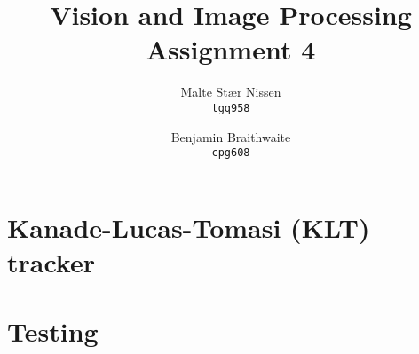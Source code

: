\documentclass[11pt,a4paper]{article}
\title{Vision and Image Processing\\Assignment 4}
\author{Malte Stær Nissen    \\ \texttt{tgq958} \and
        Benjamin Braithwaite \\ \texttt{cpg608}}
\begin{document}
\maketitle

\section{Kanade-Lucas-Tomasi (KLT) tracker}

\section{Testing}
\end{document}
